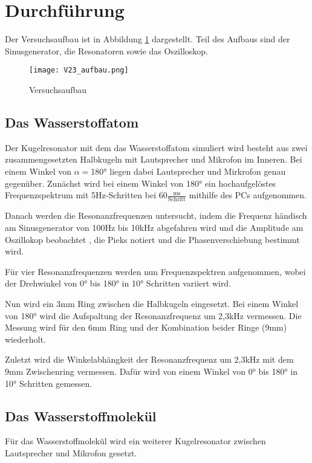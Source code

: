 \section{Durchführung}

\noindent
Der Versuchsaufbau ist in Abbildung \ref{fig:aufbau} dargestellt.
Teil des Aufbaus sind der Sinusgenerator, die Resonatoren sowie das Oszilloskop.

\begin{figure}
  \centering
  \texttt{[image: V23\_aufbau.png]}
  \caption{Versuchsaufbau \cite{V23}}
  \label{fig:aufbau}
\end{figure}


\subsection{Das Wasserstoffatom}
\label{Wasserstoffatom}
\noindent
Der Kugelresonator mit dem das Wasserstoffatom simuliert wird besteht aus zwei zusammengesetzten Halbkugeln mit Lautsprecher und Mikrofon im Inneren.
Bei einem Winkel von $\alpha=$180° liegen dabei Lautsprecher und Mirkrofon genau gegenüber.
Zunächst wird bei einem Winkel von 180° ein hochaufgelöstes Frequenzspektrum mit 5Hz-Schritten bei $60\frac{\text{ms}}{\text{Schritt}}$ mithilfe des PCs aufgenommen.

\noindent
Danach werden die Resonanzfrequenzen untersucht, indem die Frequenz händisch am Sinusgenerator von 100Hz bis 10kHz abgefahren wird und die Amplitude am Oszillokop beobachtet
, die Pieks notiert und die Phasenverschiebung bestimmt wird.

\noindent
Für vier Resonanzfrequenzen werden nun Frequenzspektren aufgenommen, wobei der Drehwinkel von 0° bis 180° in 10° Schritten variiert wird.

\noindent
Nun wird ein 3mm Ring zwischen die Halbkugeln eingesetzt.
Bei einem Winkel von 180° wird die Aufspaltung der Resonanzfrequenz um 2,3kHz vermessen.
Die Messung wird für den 6mm Ring und der Kombination beider Ringe (9mm) wiederholt.

\noindent
Zuletzt wird die Winkelabhängkeit der Resonanzfrequenz um 2,3kHz mit dem 9mm Zwischenring vermessen.
Dafür wird von einem Winkel von 0° bis 180° in 10° Schritten gemessen.

\subsection{Das Wasserstoffmolekül}
\noindent
Für das Wasserstoffmolekül wird ein weiterer Kugelresonator zwischen Lautsprecher und Mikrofon gesetzt.

